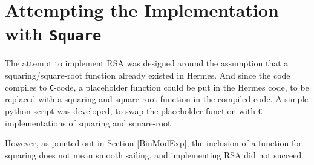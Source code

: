 
\section{Attempting the Implementation with \texttt{Square}}
The attempt to implement RSA was designed around the assumption that a squaring/square-root function already existed in Hermes. And since the code compiles to \texttt{C}-code, a placeholder function could be put in the Hermes code, to be replaced with a squaring and square-root function in the compiled code. A simple python-script was developed, to swap the placeholder-function with \texttt{C}-implementations of squaring and square-root.

However, as pointed out in Section \ref{BinModExp}, the inclusion of a function for squaring does not mean smooth sailing, and implementing RSA did not succeed. 




